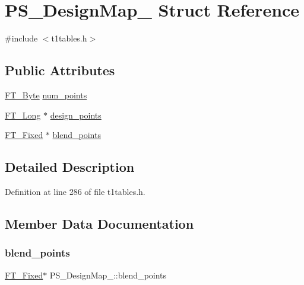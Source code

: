 \hypertarget{struct_p_s___design_map__}{}\section{P\+S\+\_\+\+Design\+Map\+\_\+ Struct Reference}
\label{struct_p_s___design_map__}


{\ttfamily \#include $<$t1tables.\+h$>$}

\subsection*{Public Attributes}
\begin{DoxyCompactItemize}
\item 
\mbox{\hyperlink{fttypes_8h_a51f26183ca0c9f4af958939648caeccd}{F\+T\+\_\+\+Byte}} \mbox{\hyperlink{struct_p_s___design_map___a505a70dd0f497f177fffca9bc4e5d0a5}{num\+\_\+points}}
\item 
\mbox{\hyperlink{fttypes_8h_a7fa72a1f0e79fb1860c5965789024d6f}{F\+T\+\_\+\+Long}} $\ast$ \mbox{\hyperlink{struct_p_s___design_map___abd7a86ba33248ceed657c31063b49679}{design\+\_\+points}}
\item 
\mbox{\hyperlink{fttypes_8h_a5f5a679cc09f758efdd0d1c5feed3c3d}{F\+T\+\_\+\+Fixed}} $\ast$ \mbox{\hyperlink{struct_p_s___design_map___a74a555fb4315fca7477f6d20d49686ec}{blend\+\_\+points}}
\end{DoxyCompactItemize}


\subsection{Detailed Description}


Definition at line 286 of file t1tables.\+h.



\subsection{Member Data Documentation}
\mbox{\label{struct_p_s___design_map___a74a555fb4315fca7477f6d20d49686ec}} 
\subsubsection{\texorpdfstring{blend\_points}{blend\_points}}
{\footnotesize\ttfamily \mbox{\hyperlink{fttypes_8h_a5f5a679cc09f758efdd0d1c5feed3c3d}{F\+T\+\_\+\+Fixed}}$\ast$ P\+S\+\_\+\+Design\+Map\+\_\+\+::blend\+\_\+points}



